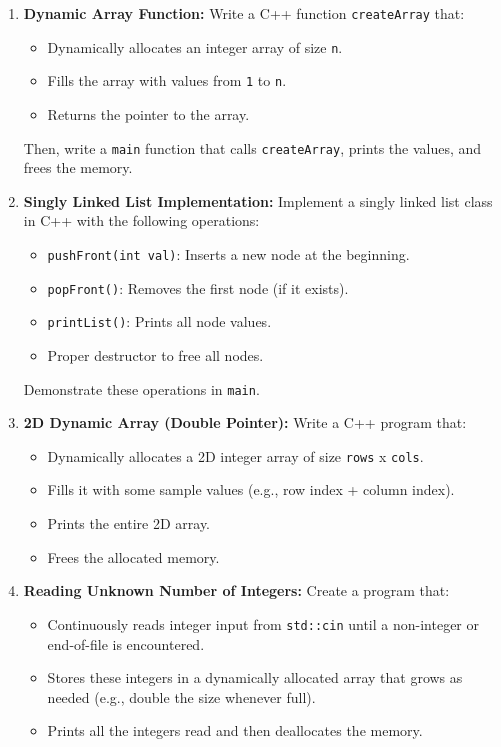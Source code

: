 \documentclass[a4paper,12pt]{article}
\begin{document}
\begin{enumerate}
    \item \textbf{Dynamic Array Function:} 
    Write a C++ function \texttt{createArray} that:
    \begin{itemize}
        \item Dynamically allocates an integer array of size \texttt{n}.
        \item Fills the array with values from \texttt{1} to \texttt{n}.
        \item Returns the pointer to the array.
    \end{itemize}
    Then, write a \texttt{main} function that calls \texttt{createArray}, prints the values, and frees the memory.

    \item \textbf{Singly Linked List Implementation:}
    Implement a singly linked list class in C++ with the following operations:
    \begin{itemize}
        \item \texttt{pushFront(int val)}: Inserts a new node at the beginning.
        \item \texttt{popFront()}: Removes the first node (if it exists).
        \item \texttt{printList()}: Prints all node values.
        \item Proper destructor to free all nodes.
    \end{itemize}
    Demonstrate these operations in \texttt{main}.

    \item \textbf{2D Dynamic Array (Double Pointer):}
    Write a C++ program that:
    \begin{itemize}
        \item Dynamically allocates a 2D integer array of size \texttt{rows} x \texttt{cols}.
        \item Fills it with some sample values (e.g., row index + column index).
        \item Prints the entire 2D array.
        \item Frees the allocated memory.
    \end{itemize}

    \item \textbf{Reading Unknown Number of Integers:}
    Create a program that:
    \begin{itemize}
        \item Continuously reads integer input from \texttt{std::cin} until a non-integer or end-of-file is encountered.
        \item Stores these integers in a dynamically allocated array that grows as needed (e.g., double the size whenever full).
        \item Prints all the integers read and then deallocates the memory.
    \end{itemize}


\end{enumerate}
\end{document}
